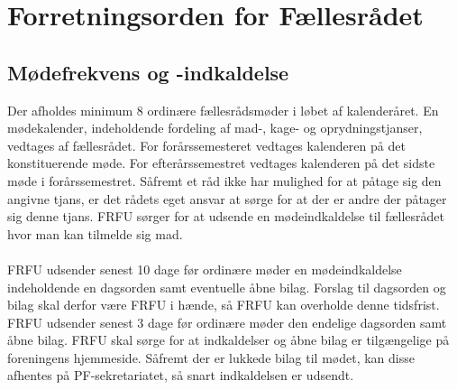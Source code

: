 \section{Forretningsorden for Fællesrådet}

\subsection{Mødefrekvens og -indkaldelse}
Der afholdes minimum 8 ordinære fællesrådsmøder i løbet af kalenderåret. En mødekalender, indeholdende fordeling af mad-, kage- og oprydningstjanser, vedtages af fællesrådet. For forårssemesteret vedtages kalenderen på det konstituerende møde. For efterårssemestret vedtages kalenderen på det sidste møde i forårssemestret. Såfremt et råd ikke har mulighed for at påtage sig den angivne tjans, er det rådets eget ansvar at sørge for at der er andre der påtager sig denne tjans. FRFU sørger for at udsende en mødeindkaldelse til fællesrådet hvor man kan tilmelde sig mad.\\
\\
FRFU udsender senest 10 dage før ordinære møder en mødeindkaldelse indeholdende en dagsorden samt eventuelle åbne bilag. Forslag til dagsorden og bilag skal derfor være FRFU i hænde, så FRFU kan overholde denne tidsfrist. FRFU udsender senest 3 dage før ordinære møder den endelige dagsorden samt åbne bilag. FRFU skal sørge for at indkaldelser og åbne bilag er tilgængelige på foreningens hjemmeside. Såfremt der er lukkede bilag til mødet, kan disse afhentes på PF-sekretariatet, så snart indkaldelsen er udsendt.
\\
\\

